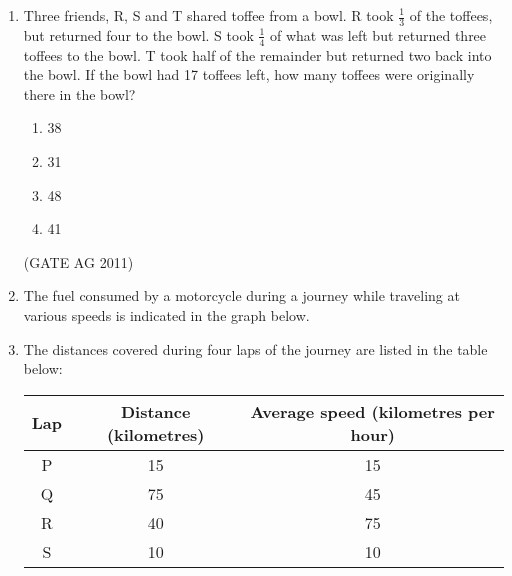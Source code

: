 \documentclass[journal,12pt,onecolumn]{IEEEtran}
\theoremstyle{remark}
\begin{document}
\begin{enumerate}
\item Three friends, R, S and T shared toffee from a bowl. R took $\frac{1}{3}$ of the toffees, but returned four to the bowl.  
S took $\frac{1}{4}$ of what was left but returned three toffees to the bowl.  
T took half of the remainder but returned two back into the bowl.  
If the bowl had 17 toffees left, how many toffees were originally there in the bowl?

\begin{multicols}{4}
\begin{enumerate}
\item 38
\item 31
\item 48
\item 41
\end{enumerate}
\end{multicols}
\hfill{(GATE AG 2011)}

\item The fuel consumed by a motorcycle during a journey while traveling at various speeds is indicated in the graph below.  







\item The distances covered during four laps of the journey are listed in the table below:  

\begin{center}
\begin{tabular}{|c|c|c|}
\hline
\textbf{Lap} & \textbf{Distance (kilometres)} & \textbf{Average speed (kilometres per hour)} \\
\hline
P & 15 & 15 \\
Q & 75 & 45 \\
R & 40 & 75 \\
S & 10 & 10 \\
\hline
\end{tabular}
\end{center}



\end{enumerate}
\end{document}
